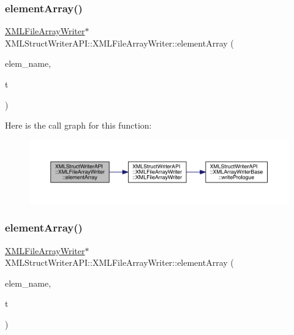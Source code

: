 \subsubsection{\texorpdfstring{elementArray()}{elementArray()}\hspace{0.1cm}{\footnotesize\ttfamily [5/6]}}
{\footnotesize\ttfamily \mbox{\hyperlink{classXMLStructWriterAPI_1_1XMLFileArrayWriter}{X\+M\+L\+File\+Array\+Writer}}$\ast$ X\+M\+L\+Struct\+Writer\+A\+P\+I\+::\+X\+M\+L\+File\+Array\+Writer\+::element\+Array (\begin{DoxyParamCaption}\item[{const std\+::string \&}]{elem\+\_\+name,  }\item[{\mbox{\hyperlink{namespaceXMLStructWriterAPI_a2017208be87c77a32bdc19ea2f14d032}{Array\+Type}}}]{t }\end{DoxyParamCaption})\hspace{0.3cm}{\ttfamily [inline]}}

Here is the call graph for this function\+:
\nopagebreak
\begin{figure}[H]
\begin{center}
\leavevmode
\includegraphics[width=350pt]{d1/d9d/classXMLStructWriterAPI_1_1XMLFileArrayWriter_ad455da07ae5725cffdab8b056681ec2d_cgraph}
\end{center}
\end{figure}
\mbox{\label{classXMLStructWriterAPI_1_1XMLFileArrayWriter_ad455da07ae5725cffdab8b056681ec2d}} 
\subsubsection{\texorpdfstring{elementArray()}{elementArray()}\hspace{0.1cm}{\footnotesize\ttfamily [6/6]}}
{\footnotesize\ttfamily \mbox{\hyperlink{classXMLStructWriterAPI_1_1XMLFileArrayWriter}{X\+M\+L\+File\+Array\+Writer}}$\ast$ X\+M\+L\+Struct\+Writer\+A\+P\+I\+::\+X\+M\+L\+File\+Array\+Writer\+::element\+Array (\begin{DoxyParamCaption}\item[{const std\+::string \&}]{elem\+\_\+name,  }\item[{\mbox{\hyperlink{namespaceXMLStructWriterAPI_a2017208be87c77a32bdc19ea2f14d032}{Array\+Type}}}]{t }\end{DoxyParamCaption})\hspace{0.3cm}{\ttfamily [inline]}}


